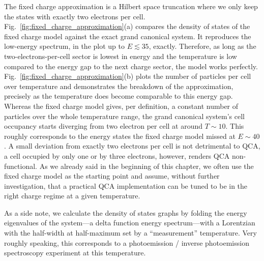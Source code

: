 %
The fixed charge approximation is a Hilbert space truncation where we only keep
the states with exactly two electrons per cell.
Fig.~\ref{fig:fixed_charge_approximation}(a) compares the density of states of
the fixed charge model against the exact grand canonical system. It reproduces
the low-energy spectrum, in the plot up to $E \lesssim 35$, exactly. Therefore,
as long as the two-electrons-per-cell sector is lowest in energy and the
temperature is low compared to the energy gap to the next charge sector, the
model works perfectly. Fig.~\ref{fig:fixed_charge_approximation}(b) plots the
number of particles per cell over temperature and demonstrates the breakdown of
the approximation, precisely as the temperature does become comparable to this
energy gap. Whereas the fixed charge model gives, per definition, a constant
number of particles over the whole temperature range, the grand canonical
system's cell occupancy starts diverging from two electron per cell at around $T
\sim 10$. This roughly corresponds to the energy states the fixed charge model
missed at $E \sim 40$. A small deviation from exactly two electrons per cell is
not detrimental to QCA, a cell occupied by only one or by three electrons,
however, renders QCA non-functional. As we already said in the beginning of this
chapter, we often use the fixed charge model as the starting point and assume,
without further investigation, that a practical QCA implementation can be tuned
to be in the right charge regime at a given temperature.

As a side note, we calculate the density of states graphs by folding the energy
eigenvalues of the system---a delta function energy spectrum---with a Lorentzian
with the half-width at half-maximum set by a ``measurement'' temperature. Very
roughly speaking, this corresponds to a photoemission / inverse photoemission
spectroscopy experiment at this temperature.


